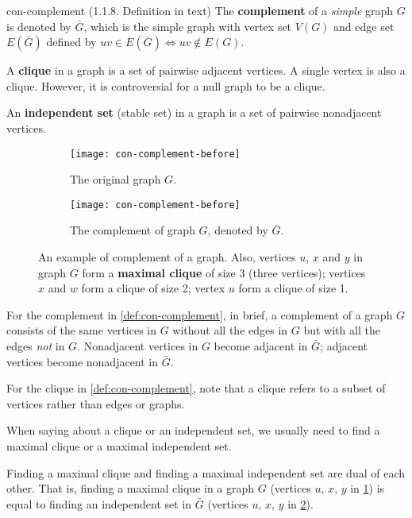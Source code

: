 \documentclass[../src/handouts/main.tex]{subfiles}
\begin{document}
\begin{definition}{}{con-complement}
  (1.1.8. Definition in text)
  The \textbf{complement} of a \textit{simple} graph $G$ is denoted by $\bar G$, which is the simple graph with vertex set $V(G)$ and edge set $E(\bar G)$ defined by $uv \in E(\bar G) \iff uv \notin E(G)$.

  A \textbf{clique} in a graph is a set of pairwise adjacent vertices. A single vertex is also a clique. However, it is controversial for a null graph to be a clique.

  An \textbf{independent set} (stable set) in a graph is a set of pairwise nonadjacent vertices.
\end{definition}

\begin{figure}[htbp]
  \centering
  \begin{subfigure}[t]{.3\textwidth}
    \centering
    \texttt{[image: con-complement-before]}
    \caption{The original graph $G$.}
    \label{fig:con-complement-before}
  \end{subfigure}
  \hspace{.1\textwidth}
  \begin{subfigure}[t]{.3\textwidth}
    \centering
    \texttt{[image: con-complement-before]}
    \caption{The complement of graph $G$, denoted by $\bar G$.}
    \label{fig:con-complement-after}
  \end{subfigure}
  \caption{An example of complement of a graph. Also, vertices $u$, $x$ and $y$ in graph $G$ form a \textbf{maximal clique} of size 3 (three vertices); vertices $x$ and $w$ form a clique of size 2; vertex $u$ form a clique of size 1.}
  \label{fig:con-complement}
\end{figure}

For the complement in \cref{def:con-complement}, in brief, a complement of a graph $G$ consists of the same vertices in $G$ without all the edges in $G$ but with all the edges \textit{not} in $G$. Nonadjacent vertices in $G$ become adjacent in $\bar{G}$; adjacent vertices become nonadjacent in $\bar{G}$.

For the clique in \cref{def:con-complement}, note that a clique refers to a subset of vertices rather than edges or graphs.

When saying about a clique or an independent set, we usually need to find a maximal clique or a maximal independent set.

Finding a maximal clique and finding a maximal independent set are dual of each other. That is, finding a maximal clique in a graph $G$ (vertices $u,\, x,\, y$ in \cref{fig:con-complement-before}) is equal to finding an independent set in $\bar G$ (vertices $u,\, x,\, y$ in \cref{fig:con-complement-after}). 
\end{document}
